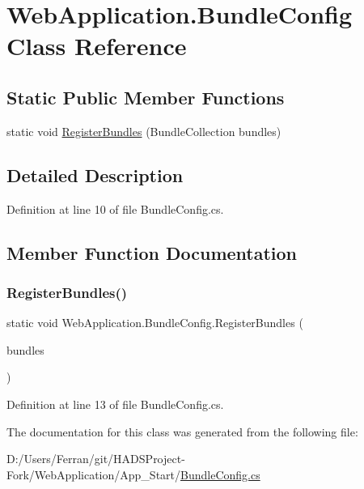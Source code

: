 \hypertarget{classWebApplication_1_1BundleConfig}{}\section{Web\+Application.\+Bundle\+Config Class Reference}
\label{classWebApplication_1_1BundleConfig}
\subsection*{Static Public Member Functions}
\begin{DoxyCompactItemize}
\item 
static void \mbox{\hyperlink{classWebApplication_1_1BundleConfig_ae7996f334a178306dd44a72beebc2494}{Register\+Bundles}} (Bundle\+Collection bundles)
\end{DoxyCompactItemize}


\subsection{Detailed Description}


Definition at line 10 of file Bundle\+Config.\+cs.



\subsection{Member Function Documentation}
\mbox{\label{classWebApplication_1_1BundleConfig_ae7996f334a178306dd44a72beebc2494}} 
\subsubsection{\texorpdfstring{RegisterBundles()}{RegisterBundles()}}
{\footnotesize\ttfamily static void Web\+Application.\+Bundle\+Config.\+Register\+Bundles (\begin{DoxyParamCaption}\item[{Bundle\+Collection}]{bundles }\end{DoxyParamCaption})\hspace{0.3cm}{\ttfamily [static]}}



Definition at line 13 of file Bundle\+Config.\+cs.



The documentation for this class was generated from the following file\+:\begin{DoxyCompactItemize}
\item 
D\+:/\+Users/\+Ferran/git/\+H\+A\+D\+S\+Project-\/\+Fork/\+Web\+Application/\+App\+\_\+\+Start/\mbox{\hyperlink{BundleConfig_8cs}{Bundle\+Config.\+cs}}\end{DoxyCompactItemize}

